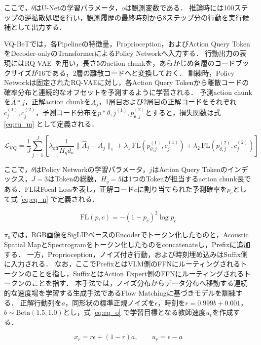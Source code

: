 \documentclass{article}
\begin{document}
	ここで，$\theta$はU-Netの学習パラメータ，$o$は観測変数である．
	推論時には100ステップの逆拡散処理を行い，観測履歴の最終時刻から8ステップ分の行動を実行候補として出力する．

	VQ-BeTでは，各Pipelineの特徴量，Proprioception，およびAction Query TokenをDecoder-onlyのTransformerによるPolicy Networkへ入力する．
	行動出力の表現にはRQ-VAE~\citep{rqvae}を用い，長さ$5$のaction chunkを，あらかじめ各層のコードブックサイズが$16$である，2層の離散コードへと変換しておく．
	訓練時，Policy Networkは固定されたRQ-VAEに対し，各Action Query Tokenから離散コードの確率分布と連続的なオフセットを予測するように学習される．
	予測action chunkを$\hat{A}*j$，正解action chunkを$A_j$，1層目および2層目の正解コードをそれぞれ$c_j^{(1)}, c_j^{(2)}$，予測コード分布を$p*{\theta,j}^{(1)}, p_{\theta,j}^{(2)}$とすると，損失関数は式 \ref{eq:eq_m} として定義される．

	\begin{equation}
	\label{eq:eq_m}
	\mathcal{L}_{\mathrm{VQ}} =\frac{1}{J}\sum_{j=1}^{J}\left[ \lambda_{\mathrm{off}}\frac{1}{H_q d_a}\|\hat{A}_j-A_j\|_1 +\lambda_1\,\mathrm{FL}(p_{\theta,j}^{(1)},c_j^{(1)}) +\lambda_2\,\mathrm{FL}(p_{\theta,j}^{(2)},c_j^{(2)}) \right]
	\end{equation}

	ここで，$\theta$はPolicy Networkの学習パラメータ，$j$はAction Query Tokenのインデックス，$J=3$はTokenの総数，$H_q=5$は1つのTokenが担当するaction chunk長である．$\mathrm{FL}$はFocal Lossを表し，正解コード$c$に割り当てられた予測確率を$p_c$として式 \ref{eq:eq_n} で定義される．

	\begin{equation}
	\label{eq:eq_n}
	\mathrm{FL}(p,c)=-(1-p_c)^2\log p_c
	\end{equation}

	$\pi_0$では，RGB画像をSigLIPベースのEncoderでトークン化したものと，Acoustic Spatial MapとSpectrogramをトークン化したものをconcatenateし，Prefixに追加する．
	一方，Proprioception，ノイズ付き行動，および時刻埋め込みはSuffix側に入力される．
	なお，ここでPrefixとはVLM側のFFNにルーティングされるトークンのことを指し，SuffixとはAction Expert側のFFNにルーティングされるトークンのことを指す．
	本手法では，ノイズ分布からデータ分布へ移動する連続的な速度場を学習する生成手法であるFlow Matchingに基づきモデルを訓練する．
	正解行動列を$a$，同形状の標準正規ノイズを$\epsilon$，時刻を$r=0.999b+0.001$，$b\sim\mathrm{Beta}(1.5,1.0)$とし，式 \ref{eq:eq_o} で学習目標となる教師速度$u_r$を作成する．

	\begin{equation}
	\label{eq:eq_o}
	x_r=r\epsilon+(1-r)a,\qquad u_r=\epsilon-a
	\end{equation}
\end{document}
